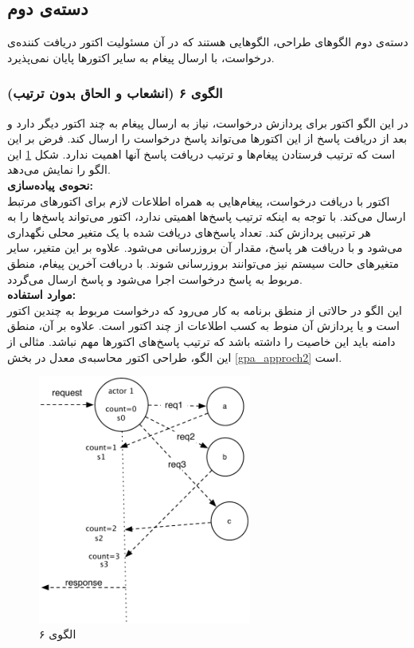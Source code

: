 \subsection{دسته‌ی دوم}
دسته‌ی دوم الگوهای طراحی، الگوهایی هستند که در آن مسئولیت اکتور دریافت کننده‌ی درخواست، با ارسال‌ پیغام به سایر اکتورها پایان نمی‌پذیرد.

\subsubsection{الگوی ۶ (انشعاب و الحاق بدون ترتیب)}

در این الگو اکتور برای پردازش درخواست، نیاز به ارسال پیغام به چند اکتور دیگر دارد و بعد از دریافت پاسخ از این اکتورها می‌تواند پاسخ درخواست را ارسال کند. فرض بر این است که ترتیب فرستادن پیغام‌ها و ترتیب دریافت پاسخ‌ آنها اهمیت ندارد. شکل \ref{fig:Patterns_statefull_6} این الگو را نمایش می‌دهد.\\
\textbf{نحوه‌ی پیاده‌سازی:}\\
اکتور با دریافت درخواست، پیغام‌هایی به همراه اطلاعات لازم برای اکتورهای مرتبط ارسال می‌کند. با توجه به اینکه ترتیب پاسخ‌ها اهمیتی ندارد، اکتور می‌تواند پاسخ‌ها را به هر ترتیبی پردازش کند. تعداد پاسخ‌های دریافت شده با یک متغیر محلی نگهداری می‌شود و با دریافت هر پاسخ، مقدار آن بروزرسانی می‌شود. علاوه بر این متغیر، سایر متغیرهای حالت سیستم نیز می‌توانند بروزرسانی شوند. با دریافت آخرین پیغام، منطق مربوط به پاسخ درخواست اجرا می‌شود و پاسخ ارسال می‌گردد.\\
\textbf{موارد استفاده:}\\
این الگو در حالاتی از منطق برنامه به کار می‌رود که درخواست مربوط به چندین اکتور است و یا پردازش آن منوط به کسب اطلاعات از چند اکتور است. علاوه بر آن، منطق دامنه باید این خاصیت را داشته باشد که ترتیب پاسخ‌های اکتورها مهم نباشد. مثالی از این الگو، طراحی اکتور محاسبه‌ی معدل در بخش \ref{gpa_approch2} است.
\begin{figure}[ht]
    \begin{center}
	\includegraphics[width=7cm]{4-ProposedFramework/Figures/Patterns_statelfull_fj.pdf}
    \end{center}
    \caption{\label{fig:Patterns_statefull_6}الگوی ۶}
\end{figure}
\FloatBarrier
